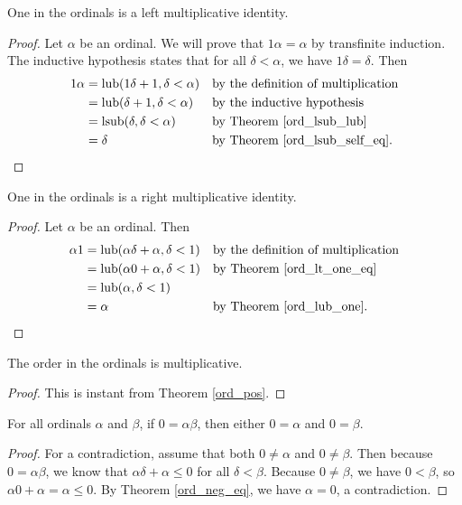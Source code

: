 \documentclass[../../math.tex]{subfiles}
\begin{document}
\begin{instance}
    One in the ordinals is a left multiplicative identity.
\end{instance}
\begin{proof}
    Let $\alpha$ be an ordinal.  We will prove that $1\alpha = \alpha$ by
    transfinite induction.  The inductive hypothesis states that for all $\delta
    < \alpha$, we have $1\delta = \delta$.  Then
    \begin{align*}
        1\alpha
        &= \operatorname{lub}(1\delta + 1, \delta < \alpha)
            && \text{by the definition of multiplication} \\
        &= \operatorname{lub}(\delta + 1, \delta < \alpha)
            && \text{by the inductive hypothesis} \\
        &= \operatorname{lsub}(\delta, \delta < \alpha)
            && \text{by Theorem \ref{ord_lsub_lub}} \\
        &= \delta
            && \text{by Theorem \ref{ord_lsub_self_eq}.} \\
    \end{align*}
\end{proof}

\begin{instance}
    One in the ordinals is a right multiplicative identity.
\end{instance}
\begin{proof}
    Let $\alpha$ be an ordinal.  Then
    \begin{align*}
        \alpha1
        &= \operatorname{lub}(\alpha \delta + \alpha, \delta < 1)
            && \text{by the definition of multiplication} \\
        &= \operatorname{lub}(\alpha 0 + \alpha, \delta < 1)
            && \text{by Theorem \ref{ord_lt_one_eq}} \\
        &= \operatorname{lub}(\alpha, \delta < 1) && \\
        &= \alpha
            && \text{by Theorem \ref{ord_lub_one}.} \\
    \end{align*}
\end{proof}

\begin{instance}
    The order in the ordinals is multiplicative.
\end{instance}
\begin{proof}
    This is instant from Theorem \ref{ord_pos}.
\end{proof}

\begin{theorem} \label{ord_mult_zero} \label{ord_mult_nz}
    For all ordinals $\alpha$ and $\beta$, if $0 = \alpha \beta$, then either $0
    = \alpha$ and $0 = \beta$.
\end{theorem}
\begin{proof}
    For a contradiction, assume that both $0 \neq \alpha$ and $0 \neq \beta$.
    Then because $0 = \alpha \beta$, we know that $\alpha \delta + \alpha \leq
    0$ for all $\delta < \beta$.  Because $0 \neq \beta$, we have $0 < \beta$,
    so $\alpha 0 + \alpha = \alpha \leq 0$.  By Theorem \ref{ord_neg_eq}, we
    have $\alpha = 0$, a contradiction.
\end{proof}
\end{document}
